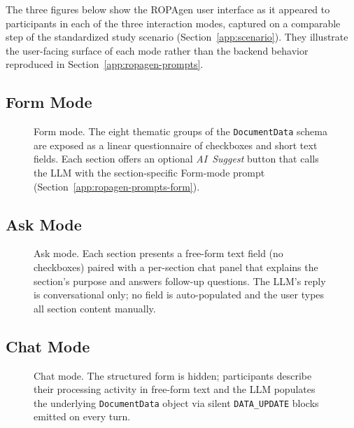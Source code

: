 The three figures below show the ROPAgen user interface as it appeared to participants in each of the three interaction modes, captured on a comparable step of the standardized study scenario (Section~\ref{app:scenario}). They illustrate the user-facing surface of each mode rather than the backend behavior reproduced in Section~\ref{app:ropagen-prompts}.

\subsection{Form Mode}
\label{app:ropagen-form-screenshot}

\begin{figure}[htbp]
\centering
\caption{Form mode. The eight thematic groups of the \texttt{DocumentData} schema are exposed as a linear questionnaire of checkboxes and short text fields. Each section offers an optional \emph{AI~Suggest} button that calls the LLM with the section-specific Form-mode prompt (Section~\ref{app:ropagen-prompts-form}).}
\end{figure}

\subsection{Ask Mode}
\label{app:ropagen-ask-screenshot}

\begin{figure}[htbp]
\centering
\caption{Ask mode. Each section presents a free-form text field (no checkboxes) paired with a per-section chat panel that explains the section's purpose and answers follow-up questions. The LLM's reply is conversational only; no field is auto-populated and the user types all section content manually.}
\end{figure}

\subsection{Chat Mode}
\label{app:ropagen-chat-screenshot}

\begin{figure}[htbp]
\centering
\caption{Chat mode. The structured form is hidden; participants describe their processing activity in free-form text and the LLM populates the underlying \texttt{DocumentData} object via silent \texttt{DATA\_UPDATE} blocks emitted on every turn.}
\end{figure}

